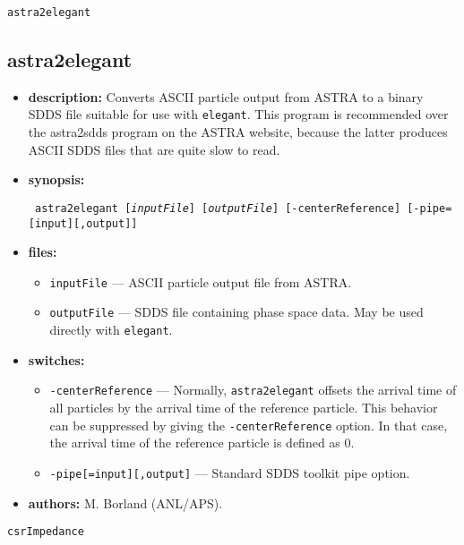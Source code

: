 \documentclass[11pt]{article}
\begin{document}
\begin{latexonly}
\newpage
\begin{center}{\Large\verb|astra2elegant|}\end{center}
\end{latexonly}
\subsection{astra2elegant}

\begin{itemize}
\item {\bf description:}   Converts ASCII particle output from ASTRA to a binary
SDDS file suitable for use with {\tt elegant}.  This program is recommended over
the astra2sdds program on the ASTRA website, because the latter produces ASCII SDDS
files that are quite slow to read.

\item {\bf synopsis:}
\begin{flushleft}{\tt
astra2elegant [{\em inputFile}] [{\em outputFile}] [-centerReference] [-pipe=[input][,output]]
}\end{flushleft}

\item {\bf files:}
\begin{itemize}
\item {\tt inputFile} --- ASCII particle output file from ASTRA.
\item {\tt outputFile} --- SDDS file containing phase space data. May be used directly with 
{\tt elegant}.
\end{itemize}

\item {\bf switches:}
\begin{itemize}
\item {\tt -centerReference} --- Normally, {\tt astra2elegant} offsets the arrival time of all particles
  by the arrival time of the reference particle.  This behavior can be suppressed by giving the
  {\tt -centerReference} option.  In that case, the arrival time of the reference particle is defined
  as 0.
\item {\tt -pipe[=input][,output]} --- Standard SDDS toolkit pipe option.
\end{itemize}

\item {\bf authors:} M. Borland (ANL/APS).

\end{itemize}

\begin{latexonly}
\newpage
\begin{center}{\Large\verb|csrImpedance|}\end{center}
\end{latexonly}
\end{document}
